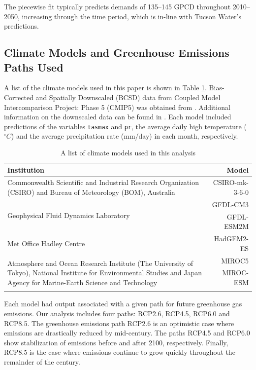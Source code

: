 \documentclass[11pt]{article}
\theoremstyle{plain}
\theoremstyle{definition}
\theoremstyle{remark}
\begin{document}
The piecewise fit typically predicts demands of 135--145 GPCD throughout 2010--2050, increasing through the time period, which is in-line with Tucson Water's predictions.


\subsection{Climate Models and Greenhouse Emissions Paths Used}

A list of the climate models used in this paper is shown in Table \ref{tb:climate_models}.
Bias-Corrected and Spatially Downscaled (BCSD) data from Coupled Model Intercomparison Project: Phase 5 (CMIP5) was obtained from \citep{cmip5}.
Additional information on the downscaled data can be found in \citep{bcsdreclamation}.
Each model included predictions of the variables \texttt{tasmax} and \texttt{pr}, the average daily high temperature ($^\circ C$) and the average precipitation rate (mm/day) in each month, respectively.

\begin{table}
	\centering
	\begin{tabular}{p{}|r}
		\hline
		Institution & Model \\
		\hline
		\hline
		Commonwealth Scientific and Industrial Research Organization (CSIRO) and Bureau of Meteorology (BOM), Australia & CSIRO-mk-3-6-0 \\
		\hline
		\multirow{2}{*}{Geophysical Fluid Dynamics Laboratory} & GFDL-CM3 \\
		 & GFDL-ESM2M \\
		\hline
		Met Office Hadley Centre & HadGEM2-ES \\
		\hline
		\multirow{3}{*}{\vbox{Atmosphere and Ocean Research Institute (The University of Tokyo), National Institute for Environmental Studies and Japan Agency for Marine-Earth Science and Technology}}  & MIROC5 \\
		 & MIROC-ESM \\
		 & \\
		\hline
	\end{tabular}
	\caption{
		A list of climate models used in this analysis
	}
	\label{tb:climate_models}
\end{table}

Each model had output associated with a given path for future greenhouse gas emissions.
Our analysis includes four paths: RCP2.6, RCP4.5, RCP6.0 and RCP8.5.
The greenhouse emissions path RCP2.6 is an optimistic case where emissions are drastically reduced by mid-century.
The paths RCP4.5 and RCP6.0 show stabilization of emissions before and after 2100, respectively.
Finally, RCP8.5 is the case where emissions continue to grow quickly throughout the remainder of the century.
\end{document}
